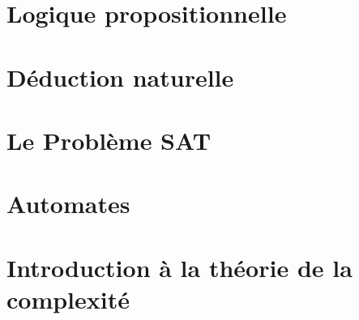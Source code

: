 \documentclass[a4paper, 12pt]{extarticle}
\begin{document}


\makemargins %
\makefrontpage
\maketoc


% 



\section{Logique propositionnelle}
\label{sec:logique_propositionnelle}

\newpage


\section{Déduction naturelle}
\label{sec:déduction_naturelle}

\newpage


\section{Le Problème SAT}
\label{sec:sat}

\newpage

\section{Automates}
\label{sec:automates}

\newpage

\section{Introduction à la théorie de la complexité}
\label{sec:complexité}

\newpage


\end{document}
